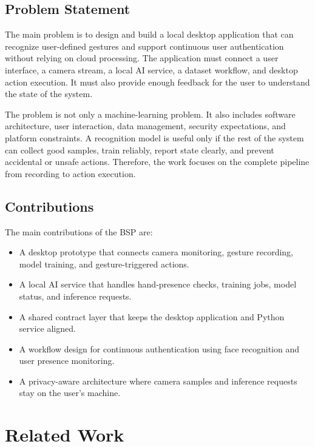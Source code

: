 \documentclass[10pt,twocolumn]{article}
\begin{document}
\subsection{Problem Statement}
The main problem is to design and build a local desktop application that can recognize user-defined gestures and support continuous user authentication without relying on cloud processing.
The application must connect a user interface, a camera stream, a local AI service, a dataset workflow, and desktop action execution.
It must also provide enough feedback for the user to understand the state of the system.

The problem is not only a machine-learning problem.
It also includes software architecture, user interaction, data management, security expectations, and platform constraints.
A recognition model is useful only if the rest of the system can collect good samples, train reliably, report state clearly, and prevent accidental or unsafe actions.
Therefore, the work focuses on the complete pipeline from recording to action execution.

\subsection{Contributions}
The main contributions of the BSP are:

\begin{itemize}[leftmargin=*]
  \item A desktop prototype that connects camera monitoring, gesture recording, model training, and gesture-triggered actions.
  \item A local AI service that handles hand-presence checks, training jobs, model status, and inference requests.
  \item A shared contract layer that keeps the desktop application and Python service aligned.
  \item A workflow design for continuous authentication using face recognition and user presence monitoring.
  \item A privacy-aware architecture where camera samples and inference requests stay on the user's machine.
\end{itemize}

\section{Related Work}
\end{document}

